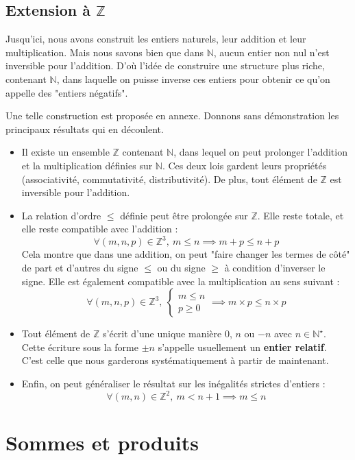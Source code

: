 \documentclass[french]{book}
\newcommand{\N}{\mathbb{N}}
\newcommand{\Z}{\mathbb{Z}}
\newcommand{\st}{^\star}
\theoremstyle{plain}
\theoremstyle{definition}
\theoremstyle{remark}
\begin{document}
\subsection{Extension à $\Z$}
Jusqu'ici, nous avons construit les entiers naturels, leur addition et leur multiplication. Mais nous savons bien que dans $\N$, aucun entier non nul n'est inversible pour l'addition. D'où l'idée de construire une structure plus riche, contenant $\N$, dans laquelle on puisse inverse ces entiers pour obtenir ce qu'on appelle des "entiers négatifs". \par Une telle construction est proposée en annexe. Donnons sans démonstration les principaux résultats qui en découlent.
\begin{itemize}
	\item Il existe un ensemble $\Z$ contenant $\N$, dans lequel on peut prolonger l'addition et la multiplication définies sur $\N$. Ces deux lois gardent leurs propriétés (associativité, commutativité, distributivité). De plus, tout élément de $\Z$ est inversible pour l'addition.
	\item La relation d'ordre $\leqslant$ définie peut être prolongée sur $\Z$. Elle reste totale, et elle reste compatible avec l'addition : $$\forall (m,n,p)\in\Z^3,\ m\leqslant n\implies m+p\leqslant n+p$$ Cela montre que dans une addition, on peut "faire changer les termes de côté" de part et d'autres du signe $\leqslant$ ou du signe $\geqslant$ à condition d'inverser le signe. Elle est également compatible avec la multiplication au sens suivant : $$\forall(m,n,p)\in\Z^3,\ \left\{\begin{array}{ll}m\leqslant n \\ p\geqslant 0\end{array}\right. \implies m\times p\leqslant n\times p$$
	\item Tout élément de $\Z$ s'écrit d'une unique manière $0$, $n$ ou $-n$ avec $n\in\N\st$. Cette écriture sous la forme $\pm n$ s'appelle usuellement un \textbf{entier relatif}. C'est celle que nous garderons systématiquement à partir de maintenant.
	\item Enfin, on peut généraliser le résultat sur les inégalités strictes d'entiers : $$\forall(m,n)\in\Z^2,\ m<n+1\implies m\leqslant n$$
\end{itemize}
\section{Sommes et produits}
\end{document}

